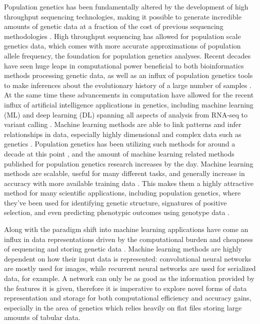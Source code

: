 Population genetics has been fundamentally altered by the development of high throughput sequencing technologies, making it possible to generate incredible amounts of genetic data at a fraction of the cost of previous sequencing methodologies \cite{zhangBiobankscaleInferenceAncestral2023a, kelleherInferringWholegenomeHistories2019, schlottererCombiningExperimentalEvolution2015}. High throughput sequencing has allowed for population scale genetics data, which comes with more accurate approximations of population allele frequency, the foundation for population genetics analyses. Recent decades have seen huge leaps in computational power beneficial to both bioinformatics methods processing genetic data, as well as an influx of population genetics tools to make inferences about the evolutionary history of a large number of samples \cite{kelleherInferringWholegenomeHistories2019, gaoNewSoftwareFast2016, koflerPoPoolation2IdentifyingDifferentiation2011, rosenzweigPowerfulMethodsDetecting2016}. At the same time these advancements in computation have allowed for the recent influx of artificial intelligence applications in genetics, including machine learning (ML) and deep learning (DL) spanning all aspects of analysis from RNA-seq to variant calling \cite{korfmannDeepLearningPopulation2023a}. Machine learning methods are able to link patterns and infer relationships in data, especially highly dimensional and complex data such as genetics \cite{erhanScalableObjectDetection2013}. Population genetics has been utilizing such methods for around a decade at this point \cite{sheehanDeepLearningPopulation2016}, and the amount of machine learning related methods published for population genetics research increases by the day. Machine learning methods are scalable, useful for many different tasks, and generally increase in accuracy with more available training data \cite{lecunDeepLearning2015}. This makes them a highly attractive method for many scientific applications, including population genetics, where they've been used for identifying genetic structure, signatures of positive selection, and even predicting phenotypic outcomes using genotype data \cite{korfmannDeepLearningPopulation2023a}. 

Along with the paradigm shift into machine learning applications have come an influx in data representations driven by the computational burden and cheapness of sequencing and storing genetic data \cite{kelleherEfficientPedigreeRecording2018}. Machine learning methods are highly dependent on how their input data is represented: convolutional neural networks are mostly used for images, while recurrent neural networks are used for serialized data, for example. A network can only be as good as the information provided by the features it is given, therefore it is imperative to explore novel forms of data representation and storage for both computational efficiency and accuracy gains, especially in the area of genetics which relies heavily on flat files storing large amounts of tabular data. 

